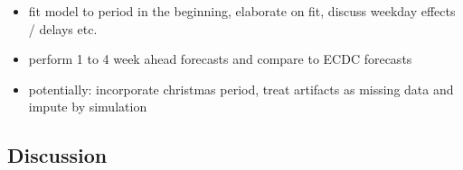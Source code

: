 \begin{itemize}
    \item fit model to period in the beginning, elaborate on fit, discuss weekday effects / delays etc.
    \item perform 1 to 4 week ahead forecasts and compare to ECDC forecasts
    \item potentially: incorporate christmas period, treat artifacts as missing data and impute by simulation
\end{itemize}

\subsection{Discussion}
